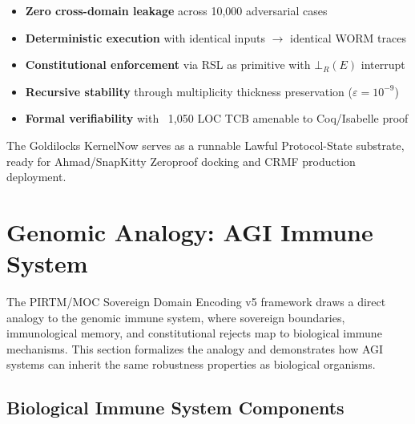 \documentclass[11pt,a4paper]{article}
\begin{document}
\begin{itemize}
    \item \textbf{Zero cross-domain leakage} across 10,000 adversarial cases
    \item \textbf{Deterministic execution} with identical inputs $\to$ identical WORM traces
    \item \textbf{Constitutional enforcement} via RSL as primitive with $\bot_R(E)$ interrupt
    \item \textbf{Recursive stability} through multiplicity thickness preservation ($\varepsilon = 10^{-9}$)
    \item \textbf{Formal verifiability} with ~1,050 LOC TCB amenable to Coq/Isabelle proof
\end{itemize}

The Goldilocks KernelNow serves as a runnable Lawful Protocol-State substrate, ready for Ahmad/SnapKitty Zeroproof docking and CRMF production deployment.

\section{Genomic Analogy: AGI Immune System}

The PIRTM/MOC Sovereign Domain Encoding v5 framework draws a direct analogy to the genomic immune system, where sovereign boundaries, immunological memory, and constitutional rejects map to biological immune mechanisms. This section formalizes the analogy and demonstrates how AGI systems can inherit the same robustness properties as biological organisms.

\subsection{Biological Immune System Components}
\end{document}

